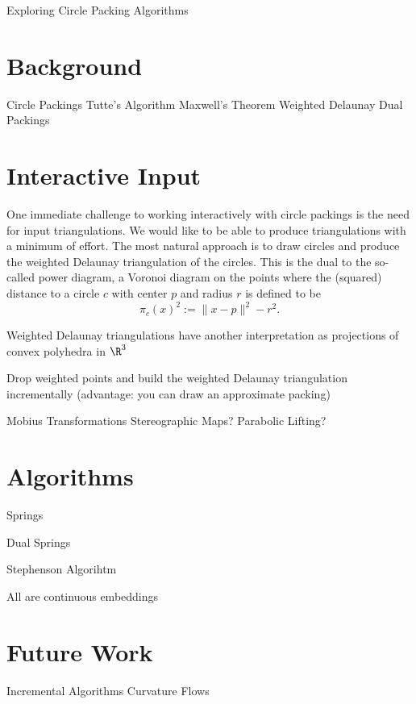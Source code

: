 

Exploring Circle Packing Algorithms

\section{Background} %
\label{sec:background}

  Circle Packings
  Tutte's Algorithm
  Maxwell's Theorem
  Weighted Delaunay
  Dual Packings


\section{Interactive Input} %
\label{sec:interactive_input}

  One immediate challenge to working interactively with circle packings is the need for input triangulations.
  We would like to be able to produce triangulations with a minimum of effort.  
  The most natural approach is to draw circles and produce the weighted Delaunay triangulation of the circles.
  This is the dual to the so-called power diagram, a Voronoi diagram on the points where the (squared) distance to a circle $c$ with center $p$ and radius $r$ is defined to be
  \[
    \pi_c(x)^2 := \|x-p\|^2 - r^2.
  \]
  
  Weighted Delaunay triangulations have another interpretation as projections of convex polyhedra in $\R^3$


  Drop weighted points and build the weighted Delaunay triangulation incrementally
  (advantage: you can draw an approximate packing)
  
  Mobius Transformations
  Stereographic Maps?
  Parabolic Lifting?
  

\section{Algorithms} %
\label{sec:algorithms}

  Springs
  
  Dual Springs
  
  Stephenson Algorihtm
  
  All are continuous embeddings


\section{Future Work} %
\label{sec:future_work}

  Incremental Algorithms
  Curvature Flows

